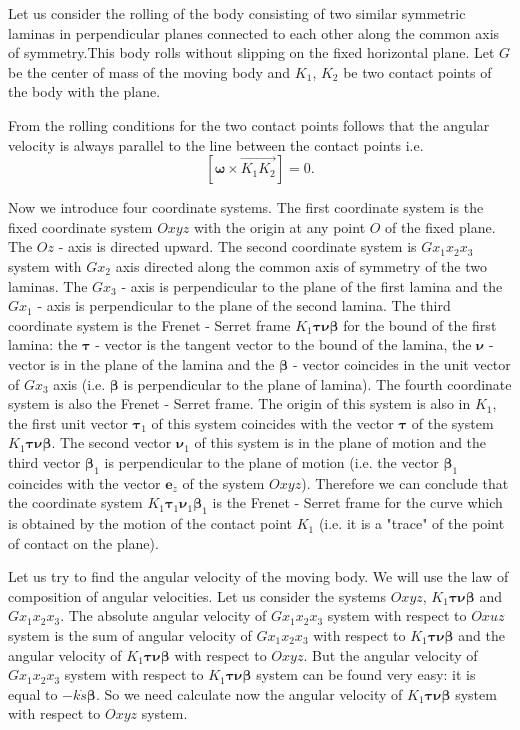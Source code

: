 \documentclass[10pt]{enoc2011}
\renewcommand{\vec}[1]{\boldsymbol{#1}}
\begin{document}
Let us consider the rolling of the body consisting of two similar symmetric laminas in perpendicular planes connected to each other along the common axis of symmetry.This body rolls without slipping on the fixed horizontal plane. Let $G$ be the center of mass of the moving body and $K_1$, $K_2$ be two contact points of the body with the plane.

From the rolling conditions for the two contact points follows that the angular velocity is always parallel to the line between the contact points i.e.
$$
\left[\vec\omega\times\overrightarrow{K_1K_2}\right]=0.
$$

Now we introduce four coordinate systems. The first coordinate system is the fixed coordinate system $Oxyz$ with the origin at any point $O$ of the fixed plane. The $Oz$ - axis is directed upward. The second coordinate system is $Gx_1x_2x_3$ system with $Gx_2$ axis directed along the common axis of symmetry of the two laminas. The $Gx_3$ - axis  is perpendicular to the plane of the first lamina and the $Gx_1$ - axis is perpendicular to the plane of the second lamina. The third coordinate system is the Frenet - Serret frame $K_1\vec\tau\vec\nu\vec\beta$ for the bound of the first lamina: the $\vec\tau$ - vector is the tangent vector to the bound of the lamina, the $\vec\nu$ - vector is in the plane of the lamina and the $\vec\beta$ - vector coincides in the unit vector of $Gx_3$ axis (i.e. $\vec\beta$ is perpendicular to the plane of lamina). The fourth coordinate system is also the Frenet - Serret frame. The origin of this system is also in $K_1$, the first unit vector $\vec\tau_1$ of this system coincides with the vector $\vec\tau$ of the system $K_1\vec\tau\vec\nu\vec\beta$. The second vector $\vec\nu_1$ of this system is in the plane of motion and the third vector $\vec\beta_1$ is perpendicular to the plane of motion (i.e. the vector $\vec\beta_1$ coincides with the vector $\vec e_z$ of the system $Oxyz$). Therefore we can conclude that the coordinate system $K_1\vec\tau_1\vec\nu_1\vec\beta_1$ is the Frenet - Serret frame for the curve which is obtained by the motion of the contact point $K_1$ (i.e. it is a "trace" of the point of contact on the plane).

Let us try to find the angular velocity of the moving body. We will use the law of composition of angular velocities. Let us consider the systems $Oxyz$, $K_1\vec\tau\vec\nu\vec\beta$ and $Gx_1x_2x_3$. The absolute angular velocity of $Gx_1x_2x_3$ system with respect to $Oxuz$ system is the sum of angular velocity of $Gx_1x_2x_3$ with respect to $K_1\vec\tau\vec\nu\vec\beta$ and the angular velocity of $K_1\vec\tau\vec\nu\vec\beta$ with respect to $Oxyz$. But the angular velocity of $Gx_1x_2x_3$ system with respect to $K_1\vec\tau\vec\nu\vec\beta$ system can be found very easy: it is equal to $-k\dot{s}\vec\beta$. So we need calculate now the angular velocity of $K_1\vec\tau\vec\nu\vec\beta$ system with respect to $Oxyz$ system.
\end{document}
